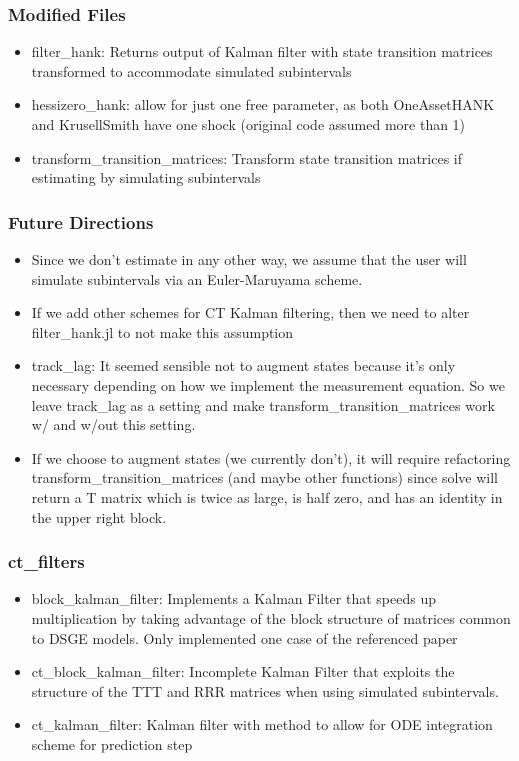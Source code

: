 \documentclass{beamer}
\begin{document}
\begin{frame}
\frametitle{Modified Files}
\begin{itemize}
\item filter\_hank: Returns output of Kalman filter with state transition matrices transformed to accommodate simulated subintervals
\item hessizero\_hank: allow for just one free parameter, as both OneAssetHANK and KrusellSmith have one shock (original code assumed more than 1)
\item transform\_transition\_matrices: Transform state transition matrices if estimating by simulating subintervals
\end{itemize}
\end{frame}
\begin{frame}
  \frametitle{Future Directions}
\begin{itemize}
\item Since we don't estimate in any other way, we assume that the user will simulate subintervals via an Euler-Maruyama scheme.
\item If we add other schemes for CT Kalman filtering, then we need to alter filter\_hank.jl to not make this assumption
\item track\_lag: It seemed sensible not to augment states because it's only necessary depending on how we implement the measurement equation. So we leave track\_lag as a setting and make transform\_transition\_matrices work w/ and w/out this setting.
\item If we choose to augment states (we currently don't), it will require refactoring transform\_transition\_matrices (and maybe other functions) since solve will return a T matrix which is twice as large, is half zero, and has an identity in the upper right block.
\end{itemize}
\end{frame}
\begin{frame}
\frametitle{ct\_filters}
\begin{itemize}
\item block\_kalman\_filter: Implements a Kalman Filter that speeds up multiplication by taking advantage of the block structure of matrices common to DSGE models. Only implemented one case of the referenced paper
\item ct\_block\_kalman\_filter: Incomplete Kalman Filter that exploits the structure of the TTT and RRR matrices when using simulated subintervals.
\item ct\_kalman\_filter: Kalman filter with method to allow for ODE integration scheme for prediction step
\end{itemize}
\end{frame}
\end{document}
